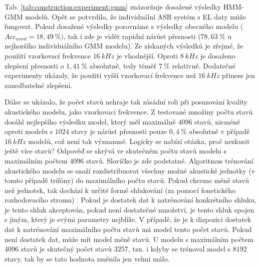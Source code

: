 
Tab. \ref{tab:construction:experiment:gmm} znázorňuje dosažené výsledky HMM-GMM modelů. Opět se potvrdilo, že individuální ASR systém s EL daty může fungovat. Pokud dosažené výsledky porovnáme s výsledky obecného modelu ($Acc_{word} = 18,49\ \%)$, tak i zde je vidět rapidní nárůst přesnosti ($78,63\ \%$ u nejhoršího individuálního GMM modelu). Ze získaných výsledků je zřejmé, že použití vzorkovací frekvence $16\ kHz$ je vhodnější. Oproti $8\ kHz$ je dosaženo zlepšení přesnosti o $1,41\ \%$ absolutně, tedy téměř $7\ \%$ relativně. Dodatečné experimenty ukázaly, že použití vyšší vzorkovací frekvence než $16\ kHz$ přinese jen zanedbatelné zlepšení.

Dálse se ukázalo, že počet stavů nehraje tak zásádní roli při posuzování kvality akustického modelu, jako vzorkovací frekvence. Z testované množiny počtu stavů dosáhl nejlepšího výsledku model, který měl maximálně $4096$ stavů, nicméně oproti modelu s $1024$ stavy je nárůst přesnosti pouze $0,4\ \%$ absolutně v případě $16\ kHz$ modelů, což není tak významné. Logicky se nabízí otázka, proč nezkusit ještě více stavů? Odpověď se skrývá ve skutečném počtu stavů modelu s maximálním počtem $4096$ stavů. Slovíčko  je zde podstatné. Algoritmus trénování akustického modelu se snaží rozdistribuovat všechny možné akustické jednotky (v tomto případě trifóny) do maximálního počtu stavů. Pokud chceme méně stavů než jednotek, tak dochází k určité formě shlukování (za pomocí fonetického rozhodovacího stromu) \cite{Holmes2001}. Pokud je dostatek dat k natrénování konkrétního shluku, je tento shluk akceptován, pokud není dostatečné množství, je tento shluk spojen s jiným, který je svými parametry nejblíže. V případě, že je k dizpozici dostatek dat k natrénování maximálního počtu stavů má model tento počet stavů. Pokud není dostatek dat, může mít model méně stavů. U modelu s maximálním počtem $4096$ stavů je skutečný počet stavů $3257$, tzn. i kdyby se trénoval model s $8192$ stavy, tak by se tato hodnota změnila jen velmi málo.

